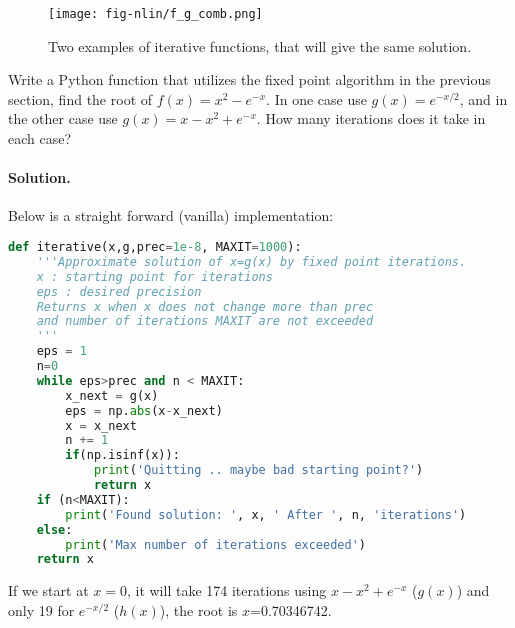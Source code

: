 \documentclass[graybox,sectrefs,envcountresetchap,open=right,final]{svmonodo}
\makeatletter
\newenvironment{doconceexercise}{}{}
\newcounter{doconceexercisecounter}%
\newcommand\listofexercises{
\chapter*{List of Exercises
          \@mkboth{List of Exercises}{List of Exercises}}
\markboth{List of Exercises}{List of Exercises}
\@starttoc{loe}
}
\makeatother
\begin{document}
\begin{figure}[!ht]  %
  \centerline{\texttt{[image: fig-nlin/f\_g\_comb.png]}}
  \caption{
  Two examples of iterative functions, that will give the same solution. \label{fig:nlin:fg}
  }
\end{figure}

\begin{doconceexercise}

                             

Write a Python function that utilizes the fixed point algorithm in the previous section, find the root of $f(x)=x^2-e^{-x}$. In one case use $g(x)=e^{-x/2}$, and in the other case use $g(x)=x-x^2+e^{-x}$. How many iterations does it take in each case?

\paragraph{Solution.}
Below is a straight forward (vanilla) implementation:























\begin{lstlisting}[language=python,style=blue1]
def iterative(x,g,prec=1e-8, MAXIT=1000):
    '''Approximate solution of x=g(x) by fixed point iterations.
    x : starting point for iterations 
    eps : desired precision
    Returns x when x does not change more than prec
    and number of iterations MAXIT are not exceeded
    '''
    eps = 1
    n=0
    while eps>prec and n < MAXIT:
        x_next = g(x)
        eps = np.abs(x-x_next)
        x = x_next
        n += 1
        if(np.isinf(x)):
            print('Quitting .. maybe bad starting point?')
            return x
    if (n<MAXIT):
        print('Found solution: ', x, ' After ', n, 'iterations')
    else:
        print('Max number of iterations exceeded')
    return x

\end{lstlisting}

If we start at $x=0$, it will take 174 iterations using $x-x^2+e^{-x}$ ($g(x)$) and only 19 for $e^{-x/2}$ ($h(x)$), the root is $x$=0.70346742.


\end{doconceexercise}
\end{document}
